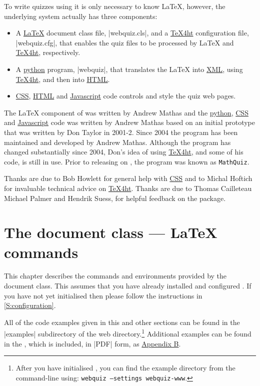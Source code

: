 \documentclass[svgnames]{article}
\newcommand\TeXfht{\href{https://www.ctan.org/tex4ht}{TeX4ht}\xspace}
\newcommand\Ctan{\ctan[]{ctan}\xspace}
\newcommand{\HTML}{\href{https://www.w3schools.com/html/html_intro.asp}{HTML}\xspace}
\newcommand\CSS{\href{https://www.w3schools.com/css}{CSS}\xspace}
\newcommand\XML{\href{https://www.w3schools.com/xml/xml_whatis.asp}{XML}\xspace}
\newcommand\Javascript{\href{https://www.w3schools.com/Js/}{Javascript}\xspace}
\newcommand\python[1][python]{\href{https://www.python.org/}{#1}\xspace}
\begin{document}
      To write quizzes using \WebQuiz it is only necessary to know
      \LaTeX, however, the underlying \WebQuiz system actually has three
      components:
      \begin{itemize}
        \item A \href{https://www.latex-project.org/}{\LaTeX} document class
        file, \BashCode|webquiz.cls|, and a \TeXfht
        configuration file, \BashCode|webquiz.cfg|, that enables the
        quiz files to be processed by \LaTeX{} and \TeXfht, respectively.
        \item A \python program,
        \BashCode|webquiz|, that translates the
        \LaTeX{} into \XML, using \TeXfht, and then into \HTML.
        \item \CSS, \HTML and \Javascript code controls and style the
        quiz web pages.
      \end{itemize}

     The \LaTeX{} component of \WebQuiz{} was written by Andrew Mathas and
     the \python, \CSS and \Javascript code was written by Andrew Mathas
     based on an initial prototype that was written by Don Taylor in 2001-2.
     Since 2004 the program has been maintained and developed by Andrew
     Mathas. Although the program has changed substantially since 2004,
     Don's idea of using \TeXfht, and some of his code, is still
     in use. Prior to releasing \WebQuiz on \Ctan, the program was known
     as \texttt{MathQuiz}.

     Thanks are due to Bob Howlett for general help with \CSS and to
     Michal Hoftich for invaluable technical advice on \TeXfht. Thanks
     are due to
        Thomas Cailleteau
        Michael Palmer and
        Hendrik Suess,
     for helpful feedback on the package.

   \section{The \WebQuiz document class --- \LaTeX{} commands}
   \label{S:documentclass}

    This chapter describes the commands and environments provided by the
    \WebQuiz document class. This assumes that you have already installed
    and configured \WebQuiz. If you have not yet initialised \WebQuiz
    then please follow the instructions in \autoref{S:configuration}.

    All of the code examples given in this and other sections can be
    found in the \BashCode|examples| subdirectory of the \WebQuiz web
    directory.\footnote{After you have initialised \WebQuiz, you can find the
    \WebQuiz example directory from the command-line using:
    \texttt{webquiz --settings webquiz-www}.}
    Additional examples can be found in the \OnlineManual*,
    which is included, in \BashCode|PDF| form, as
    \hyperref[S:online]{Appendix B}.
\end{document}
